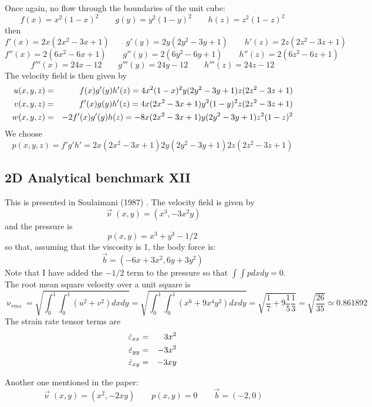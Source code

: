 Once again, no flow through the boundaries of the unit cube:
\[
f(x)=x^2(1-x)^2 \qquad
g(y)=y^2(1-y)^2 \qquad
h(z)=z^2(1-z)^2 
\]
then 
\[
f'(x)=2x(2x^2-3x+1) \qquad
g'(y)=2y(2y^2-3y+1) \qquad
h'(z)=2z(2z^2-3z+1) 
\]
\[
f''(x)=2(6x^2-6x+1) \qquad
g''(y)=2(6y^2-6y+1) \qquad
h''(z)=2(6z^2-6z+1)
\]
\[
f'''(x)=24x-12 \qquad
g'''(y)=24y-12 \qquad
h'''(z)=24z-12
\]
The velocity field is then given by
\begin{eqnarray}
u(x,y,z) 
&=& f(x) g'(y) h'(z) 
= 4 x^2(1-x)^2  y(2y^2-3y+1) z(2z^2-3z+1)  \nonumber\\
v(x,y,z) 
&=& f'(x) g(y) h'(z) 
= 4 x(2x^2-3x+1) y^2(1-y)^2 z(2z^2-3z+1) \nonumber\\
w(x,y,z) 
&=& -2f'(x) g'(y) h(z) 
= -8 x(2x^2-3x+1) y(2y^2-3y+1) z^2(1-z)^2 
\end{eqnarray}
We choose
\[
p(x,y,z)=f'g'h' = 2x(2x^2-3x+1)  2y(2y^2-3y+1)  2z(2z^2-3z+1) 
\]













\subsection{2D Analytical benchmark XII}\label{ss:sofo87_2D}

This is presented in Soulaimani \etal (1987) \cite{sofo87}. 
The velocity field is given by
\[
\vec\upnu(x,y) = (x^3,-3x^2y) 
\]
and the pressure is 
\[
p(x,y)=x^3+y^3-1/2
\]
so that, assuming that the viscosity is 1, the body force is:
\[
\vec{b} = (-6x+3x^2,6y+3y^2)
\] 
Note that I have added the $-1/2$ term to the pressure so that $\int\int p dxdy=0$.
The root mean square velocity over a unit square is 
\[
\upnu_{rms} 
= \sqrt{ \int_0^1\int_0^1 (u^2+v^2) dx dy }
= \sqrt{ \int_0^1\int_0^1 (x^6 + 9 x^4 y^2) dx dy }
= \sqrt{ \frac{1}{7} + 9 \frac{1}{5} \frac{1}{3}  } 
= \sqrt{ \frac{26}{35} }
\simeq 0.861892 
\]
The strain rate tensor terms are
\begin{eqnarray}
\dot{\varepsilon}_{xx} &=& 3x^2  \nonumber\\
\dot{\varepsilon}_{yy} &=& -3x^2 \nonumber\\ 
\dot{\varepsilon}_{xy} &=& -3xy  \nonumber
\end{eqnarray}

Another one mentioned in the paper:
\[
\vec\upnu(x,y) =(x^2,-2xy)
\qquad
p(x,y)=0
\qquad
\vec{b}=(-2,0) 
\]


